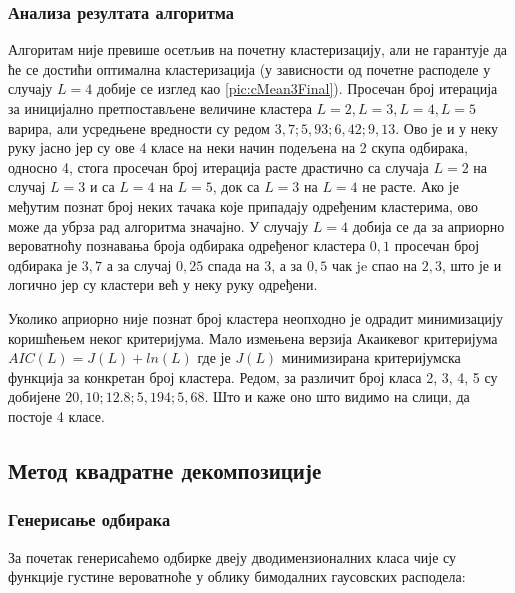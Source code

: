 \subsubsection{Анализа резултата алгоритма}
Алгоритам није превише осетљив на почетну кластеризацију, али не гарантује да ће се достићи оптимална кластеризација (у зависности од почетне расподеле у случају $L=4$ добије се изглед као \ref{pic:cMean3Final}). Просечан број итерација за иницијално претпостављене величине кластера $L=2, L=3, L=4,L=5$ варира, али усредњене вредности су редом $3,7 ; 5,93; 6,42; 9,13$. Ово је и у неку руку јасно јер су ове 4 класе на неки начин подељена на 2 скупа одбирака, односно 4, стога просечан број итерација расте драстично са случаја $L=2$ на случај $L=3$ и са $L=4$ на $L=5$, док са $L=3$ на $L=4$ не расте.  Ако је међутим познат број неких тачака које припадају одређеним кластерима, ово може да убрза рад алгоритма значајно. У случају $L=4$ добија се да за априорно вероватноћу познавања броја одбирака одређеног кластера $0,1$ просечан број одбирака је $3,7$ а за случај $0,25$ спада на 3, а за $0,5$ чак je спао на $2,3$, што је и логично јер су кластери већ у неку руку одређени. 

Уколико априорно није познат број кластера неопходно је одрадит минимизацију коришћењем неког критеријума. Мало измењена верзија Акаикевог критеријума $AIC(L) =J(L) + ln(L)$ где је $J(L)$ минимизирана критеријумска функција за конкретан број кластера. Редом, за различит број класа 2, 3, 4, 5 су добијене $20, 10;12.8;5,194;5,68$.  Што и каже оно што видимо на слици, да постоје 4 класе.

\subsection{Метод квадратне декомпозиције}
\subsubsection{Генерисање одбирака}
За почетак генерисаћемо одбирке двеју дводимензионалних класа чије су функције густине вероватноће у облику бимодалних гаусовских расподела:


